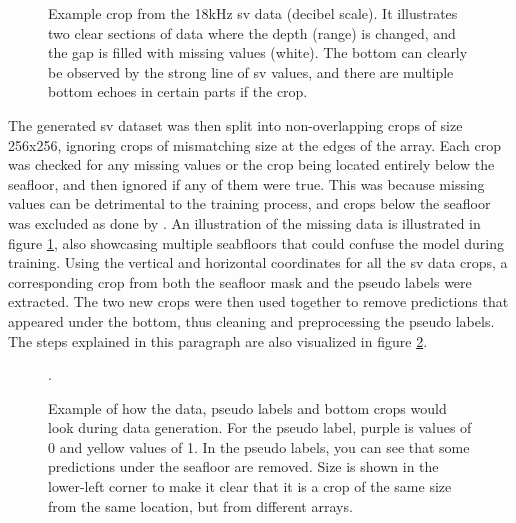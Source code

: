         \begin{figure}[H]
            \centering
            
            \caption[Missing values and bottom]{Example crop from the 18kHz \gls{sv} data (decibel scale). It illustrates two clear sections of data where the depth (range) is changed, and the gap is filled with missing values (white). The bottom can clearly be observed by the strong line of \gls{sv} values, and there are multiple bottom echoes in certain parts if the crop.}
          	\medskip 
            \label{data_bottom_nans_fig}
        \end{figure}
        
        
        The generated \gls{sv} dataset was then split into non-overlapping crops of size 256x256, ignoring crops of mismatching size at the edges of the array. Each crop was checked for any missing values or the crop being located entirely below the seafloor, and then ignored if any of them were true. This was because missing values can be detrimental to the training process, and crops below the seafloor was excluded as done by \citeauthor{brautaset2020acoustic}\cite{brautaset2020acoustic}. An illustration of the missing data is illustrated in figure \ref{data_bottom_nans_fig}, also showcasing multiple seabfloors that could confuse the model during training. Using the vertical and horizontal coordinates for all the \gls{sv} data crops, a corresponding crop from both the seafloor mask and the pseudo labels were extracted. The two new crops were then used together to remove predictions that appeared under the bottom, thus cleaning and preprocessing the pseudo labels. The steps explained in this paragraph are also visualized in figure \ref{crop_extract_fig}.
        \begin{figure}[H]
            \centering
            
            \caption[Data, label and bottom crop extraction and interaction]{Example of how the data, pseudo labels and bottom crops would look during data generation. For the pseudo label, purple is values of 0 and yellow values of 1. In the pseudo labels, you can see that some predictions under the seafloor are removed.  Size is shown in the lower-left corner to make it clear that it is a crop of the same size from the same location, but from different arrays.}.
          	\medskip 
            \label{crop_extract_fig}
        \end{figure}
        
